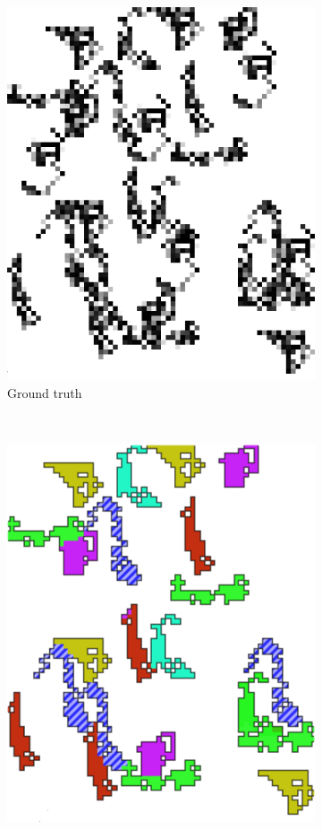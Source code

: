 \documentclass{llncs}
\begin{document}
\begin{figure}[t]
\begin{subfigure}[t]{0.25\textwidth}
\includegraphics[scale=.9]{img/exp_inputpatterns_2_cropped.png}
\caption{Ground truth}
\label{fig:rilb}
\end{subfigure}%
~
\begin{subfigure}[t]{0.25\textwidth}
\centering
\includegraphics[scale=.9]{img/exp_result_2_cropped.png}

\end{subfigure}
\end{figure}
\end{document}
